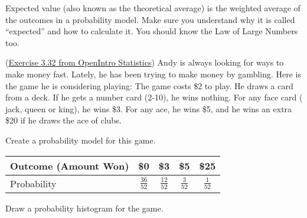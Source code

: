 \documentclass[12pt]{exam}
\newcounter{countA}
\begin{document}
Expected value (also known as the theoretical average) is the weighted
average of the outcomes in a probability model. Make sure you understand
why it is called ``expected'' and how to calculate it. You should know
the Law of Large Numbers too.

\begin{questions}
\setcounter{question}{\value{countA}}

\item
  (\href{http://people.hsc.edu/faculty-staff/blins/books/OpenIntroStats4e.pdf\#eoce.3.32}{Exercise 3.32 from OpenIntro Statistics}) Andy is always looking for ways to make money fast. Lately, he has
  been trying to make money by gambling. Here is the game he is
  considering playing: The game costs \$2 to play. He draws a card from
  a deck. If he gets a number card (2-10), he wins nothing. For any face
  card ( jack, queen or king), he wins \$3. For any ace, he wins \$5,
  and he wins an extra \$20 if he draws the ace of clubs.

  \begin{parts}
  \item
    Create a probability model for this game.
\begin{solution}
\begin{center}
  \renewcommand{\arraystretch}{1.5}
\begin{tabular}{l|c|c|c|c}
Outcome (Amount Won) & \$0 & \$3 & \$5 & \$25 \\ \hline
Probability & $\frac{36}{52}$ & $\frac{12}{52}$ & $\frac{3}{52}$ & $\frac{1}{52}$
\end{tabular}
\end{center}
\end{solution}
\vfill
  \item
    Draw a probability histogram for the game.
\begin{solution}
\begin{center}


\end{center}
\end{solution}
\end{parts}
\end{questions}
\end{document}
